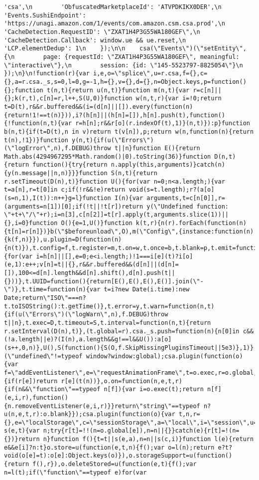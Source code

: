 \documentclass[
]{article}
\begin{document}
\begin{verbatim}
'csa',\n        'ObfuscatedMarketplaceId': 'ATVPDKIKX0DER',\n        'Events.SushiEndpoint': 'https://unagi.amazon.com/1/events/com.amazon.csm.csa.prod',\n        'CacheDetection.RequestID': \"ZXAT1H4P3G55WA180GEF\",\n        'CacheDetection.Callback': window.ue && ue.reset,\n        'LCP.elementDedup': 1\n    });\n\n    csa(\"Events\")(\"setEntity\", {\n        page: {requestId: \"ZXAT1H4P3G55WA180GEF\", meaningful: \"interactive\"},\n        session: {id: \"145-5523797-8825054\"}\n    });\n}\n!function(r){var i,e,o=\"splice\",u=r.csa,f={},c={},a=r.csa._s,s=0,l=0,g=-1,h={},v={},d={},n=Object.keys,p=function(){};function t(n,t){return u(n,t)}function m(n,t){var r=c[n]||{};k(r,t),c[n]=r,l++,S(U,0)}function w(n,t,r){var i=!0;return t=D(t),r&&r.buffered&&(i=(d[n]||[]).every(function(n){return!1!==t(n)})),i?(h[n]||(h[n]=[]),h[n].push(t),function(){!function(n,t){var r=h[n];r&&r[o](r.indexOf(t),1)}(n,t)}):p}function b(n,t){if(t=D(t),n in v)return t(v[n]),p;return w(n,function(n){return t(n),!1})}function y(n,t){if(u(\"Errors\")(\"logError\",n),f.DEBUG)throw t||n}function E(){return Math.abs(4294967295*Math.random()|0).toString(36)}function D(n,t){return function(){try{return n.apply(this,arguments)}catch(n){y(n.message||n,n)}}}function S(n,t){return r.setTimeout(D(n),t)}function U(){for(var n=0;n<a.length;){var t=a[n],r=t[0]in c;if(!r&&!e)return void(s=t.length);r?(a[o](s=n,1),I(t)):n++}g=l}function I(n){var arguments,t=c[n[0]],r=(arguments=n[1])[0];if(!t||!t[r])return y(\"Undefined function: \"+t+\"/\"+r);i=n[3],c[n[2]]=t[r].apply(t,arguments.slice(1))||{},i=0}function O(){e=1,U()}function k(t,r){n(r).forEach(function(n){t[n]=r[n]})}b(\"$beforeunload\",O),m(\"Config\",{instance:function(n){k(f,n)}}),u.plugin=D(function(n){n(t)}),t.config=f,t.register=m,t.on=w,t.once=b,t.blank=p,t.emit=function(n,t,r){for(var i=h[n]||[],e=0;e<i.length;)!1===i[e](t)?i[o](e,1):e++;v[n]=t||{},r&&r.buffered&&(d[n]||(d[n]=[]),100<=d[n].length&&d[n].shift(),d[n].push(t||{}))},t.UUID=function(){return[E(),E(),E(),E()].join(\"-\")},t.time=function(n){var t=i?new Date(i.time):new Date;return\"ISO\"===n?t.toISOString():t.getTime()},t.error=y,t.warn=function(n,t){if(u(\"Errors\")(\"logWarn\",n),f.DEBUG)throw t||n},t.exec=D,t.timeout=S,t.interval=function(n,t){return r.setInterval(D(n),t)},(t.global=r).csa._s.push=function(n){n[0]in c&&(!a.length||e)?(I(n),a.length&&g!==l&&U()):a[o](s++,0,n)},U(),S(function(){S(O,f.SkipMissingPluginsTimeout||5e3)},1)}(\"undefined\"!=typeof window?window:global);csa.plugin(function(o){var f=\"addEventListener\",e=\"requestAnimationFrame\",t=o.exec,r=o.global,u=o.on;o.raf=function(n){if(r[e])return r[e](t(n))},o.on=function(n,e,t,r){if(n&&\"function\"==typeof n[f]){var i=o.exec(t);return n[f](e,i,r),function(){n.removeEventListener(e,i,r)}}return\"string\"==typeof n?u(n,e,t,r):o.blank}});csa.plugin(function(o){var t,n,r={},e=\"localStorage\",c=\"sessionStorage\",a=\"local\",i=\"session\",u=o.exec;function s(e,t){var n;try{r[t]=!!(n=o.global[e]),n=n||{}}catch(e){r[t]=!(n={})}return n}function f(){t=t||s(e,a),n=n||s(c,i)}function l(e){return e&&e[i]?n:t}o.store=u(function(e,t,n){f();var o=l(n);return e?t?void(o[e]=t):o[e]:Object.keys(o)}),o.storageSupport=u(function(){return f(),r}),o.deleteStored=u(function(e,t){f();var n=l(t);if(\"function\"==typeof e)for(var 
\end{verbatim}
\end{document}
